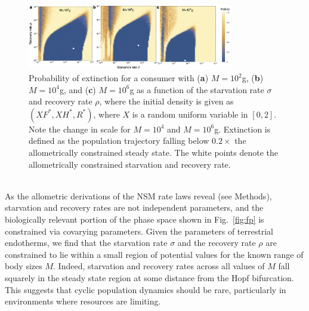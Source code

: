 \documentclass[twocolumn,preprintnumbers,amsmath,amssymb,superscriptaddress]{revtex4}
\begin{document}
\begin{bibunit}[unsrt]



\begin{figure}
\centering
\includegraphics[width=0.8\textwidth]{fig_ExtinctionAllometricComb3.eps}
\caption{\small{ Probability of extinction for a consumer with ({\bf a}) $M=10^2$g, ({\bf b}) $M=10^4$g, and ({\bf c}) $M=10^6$g as a function of the starvation rate $\sigma$ and recovery rate $\rho$, where the initial density is given as $(XF^*,XH^*,R^*)$, where $X$ is a random uniform variable in $[0,2]$. Note the change in scale for $M=10^4$ and $M=10^6$g.  Extinction is defined as the population trajectory falling below $0.2\times$ the allometrically constrained steady state. The white points denote the allometrically constrained starvation and recovery rate.}\label{fig:ext}}
\end{figure}

\\
As the allometric derivations of the NSM rate laws reveal (see Methods), starvation and recovery rates are not independent parameters, and the biologically relevant portion of the phase space shown in Fig.~\ref{fig:fp} is constrained via covarying parameters.
Given the parameters of terrestrial endotherms, we find that the starvation rate $\sigma$ and the recovery rate $\rho$ are constrained to lie within a small region of potential values for the known range of body sizes $M$.
Indeed, starvation and recovery rates across all values of $M$ fall squarely in the steady state region at some distance from the Hopf bifurcation. 
This suggests that cyclic population dynamics should be rare, particularly in environments where resources are limiting.


\end{bibunit}
\end{document}
